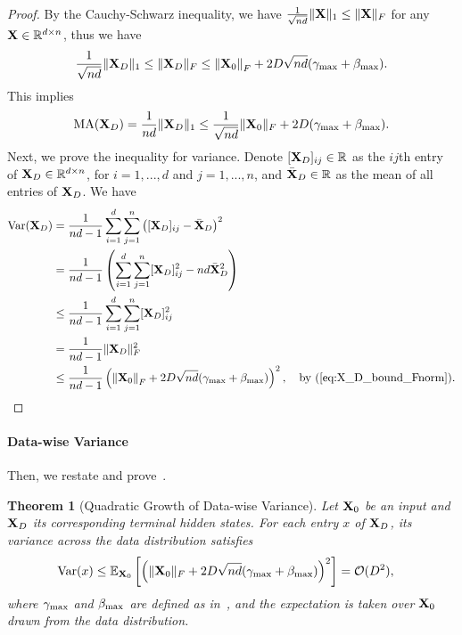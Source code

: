 \documentclass[journal]{IEEEtran}
\newcommand{\bfX}{{\bf X}}
\theoremstyle{plain}
\newtheorem{theorem}{Theorem}
\theoremstyle{definition}
\theoremstyle{remark}
\newcounter{tmpTheoremCounter}
\newcommand{\settheoremnumber}[1]{%
  \setcounter{tmpTheoremCounter}{\value{theorem}}%
  \setcounter{theorem}{\getrefnumber{#1}}%
  \addtocounter{theorem}{-1}%
}
\newcommand{\restoretheoremnumber}{%
  \setcounter{theorem}{\value{tmpTheoremCounter}}%
}
\begin{document}
\begin{proof}
    By the Cauchy-Schwarz inequality, we have $\frac{1}{\sqrt{nd}} \| \bfX \|_1 \leq \| \bfX\|_F$ for any $\bfX \in \mathbb{R}^{d \times n}$, thus we have
    \begin{align*}
        \frac{1}{\sqrt{nd}} \| \bfX_D \|_1 \leq \| \bfX_D \|_F \leq \left\|  \bfX_{0} \right\|_F + 2D \sqrt{nd} (\gamma_{\rm max} + \beta_{\rm max}).
    \end{align*}
    This implies
    \begin{equation}
        {\rm MA}(\bfX_D) = \frac{1}{nd} \| \bfX_D \|_1 \leq \frac{1}{\sqrt{nd}} \| \bfX_0 \|_F + 2D (\gamma_{\rm max} + \beta_{\rm max}).
    \end{equation}
    Next, we prove the inequality for variance. Denote $[\bfX_D]_{ij} \in \mathbb{R}$ as the $ij$th entry of $\bfX_D \in \mathbb{R}^{d \times n}$, for $i=1,...,d$ and $j = 1,...,n$, and $\bar{\bfX}_D \in \mathbb{R}$ as the mean of all entries of $\bfX_D$. We have
\begin{align*}
{\rm Var}(\bfX_D) & = \frac{1}{nd-1} \sum_{i=1}^{d} \sum_{j=1}^{n} \left(  [\bfX_D]_{ij} - \bar{\bfX}_D \right)^2 \\
& = \frac{1}{nd-1} \left( \sum_{i=1}^{d} \sum_{j=1}^{n} [\bfX_D]_{ij}^2 - nd \bar{\bfX}_D^2 \right) \\
& \leq \frac{1}{nd-1} \sum_{i=1}^{d} \sum_{j=1}^{n} [\bfX_D]_{ij}^2   \\
&= \frac{1}{nd-1} \| \bfX_D\|_F^2 \\
& \leq \frac{1}{nd-1} \left( \left\|  \bfX_{0} \right\|_F + 2D \sqrt{nd} (\gamma_{\rm max} + \beta_{\rm max}) \right)^2, \quad \text{by (\ref{eq:X_D_bound_Fnorm})}.
\end{align*}
\end{proof}

\paragraph{Data-wise Variance} Then, we restate and prove~. 

\settheoremnumber{thm:datawise_variance}

\begin{theorem}[Quadratic Growth of Data-wise Variance]
    Let $\bfX_0$ be an input and $\bfX_D$ its corresponding terminal hidden states. For each entry $x$ of $\bfX_D$, its variance across the data distribution satisfies
    \begin{equation}
    \begin{split}
        {\rm Var}(x) &\leq \mathbb{E}_{\bfX_0} \left[ \left(  \|\bfX_0\|_F + 2D\sqrt{nd}(\gamma_{\rm max} + \beta_{\rm max}) \right)^2\right] = \mathcal{O}(D^2),
    \end{split}
    \end{equation}
    where $ \gamma_{\rm max}$ and $\beta_{\rm max}$ are defined as in~, and the expectation is taken over $\bfX_0$ drawn from the data distribution.
\end{theorem}
\restoretheoremnumber
\end{document}

